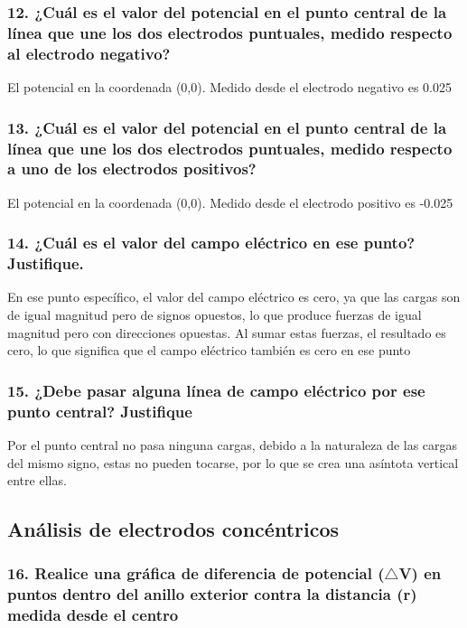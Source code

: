 \documentclass[letterpaper, 12pt]{report}
\begin{document}
\subsubsection{12. ¿Cuál es el valor del potencial en el punto central de la
	línea que une los dos electrodos puntuales, medido respecto al electrodo
	negativo?}

El potencial en la coordenada (0,0). Medido desde el electrodo negativo es 
0.025

\subsubsection{13. ¿Cuál es el valor del potencial en el punto central de la
	línea que une los dos electrodos puntuales, medido respecto a uno de los
	electrodos positivos?}

El potencial en la coordenada (0,0). Medido desde el electrodo positivo es 
-0.025

\subsubsection{14. ¿Cuál es el valor del campo eléctrico en ese punto?
	Justifique.}

En ese punto específico, el valor del campo eléctrico es
cero, ya que las cargas son de igual magnitud pero de
signos opuestos, lo que produce fuerzas de igual magnitud
pero con direcciones opuestas. Al sumar estas fuerzas, el
resultado es cero, lo que significa que el campo eléctrico
también es cero en ese punto

\subsubsection{15. ¿Debe pasar alguna línea de campo eléctrico por ese punto
	central? Justifique}

Por el punto central no pasa ninguna cargas, debido a la naturaleza de las cargas
del mismo signo, estas no pueden tocarse, por lo que se crea una asíntota
vertical entre ellas.

\subsection*{Análisis de electrodos concéntricos}

\subsubsection{16. Realice una gráfica de diferencia de potencial ($\triangle$V)
	en puntos dentro del anillo exterior contra la distancia (r) medida desde el centro}
\end{document}
